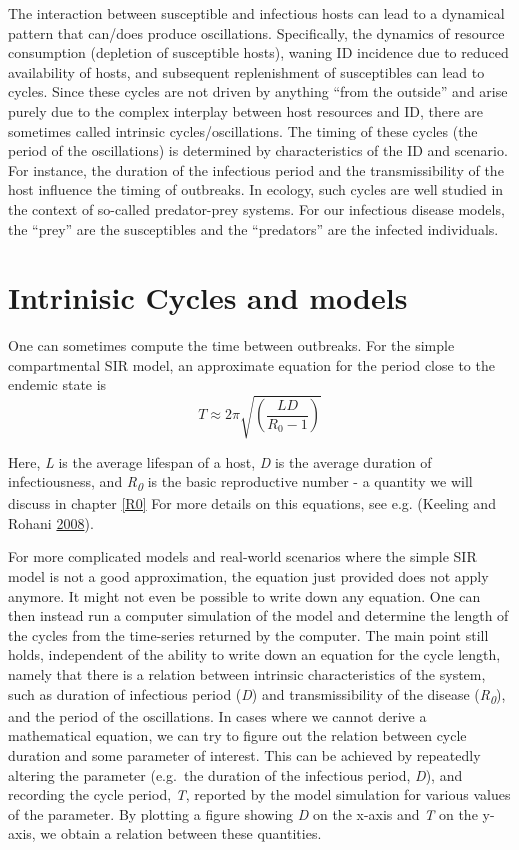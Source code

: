 \documentclass[]{book}
\theoremstyle{definition}
\theoremstyle{definition}
\theoremstyle{definition}
\theoremstyle{remark}
\begin{document}
The interaction between susceptible and infectious hosts can lead to a
dynamical pattern that can/does produce oscillations. Specifically, the
dynamics of resource consumption (depletion of susceptible hosts),
waning ID incidence due to reduced availability of hosts, and subsequent
replenishment of susceptibles can lead to cycles. Since these cycles are
not driven by anything ``from the outside'' and arise purely due to the
complex interplay between host resources and ID, there are sometimes
called intrinsic cycles/oscillations. The timing of these cycles (the
period of the oscillations) is determined by characteristics of the ID
and scenario. For instance, the duration of the infectious period and
the transmissibility of the host influence the timing of outbreaks. In
ecology, such cycles are well studied in the context of so-called
predator-prey systems. For our infectious disease models, the ``prey''
are the susceptibles and the ``predators'' are the infected individuals.

\section{Intrinisic Cycles and
models}\label{intrinisic-cycles-and-models}

One can sometimes compute the time between outbreaks. For the simple
compartmental SIR model, an approximate equation for the period close to
the endemic state is
\[T \approx 2 \pi \sqrt{\left( \frac{LD}{R_0 - 1} \right)}\]

Here, \emph{L} is the average lifespan of a host, \emph{D} is the
average duration of infectiousness, and \emph{R\textsubscript{0}} is the
basic reproductive number - a quantity we will discuss in chapter
\ref{R0} For more details on this equations, see e.g. (Keeling and
Rohani \protect\hyperlink{ref-keeling08}{2008}).

For more complicated models and real-world scenarios where the simple
SIR model is not a good approximation, the equation just provided does
not apply anymore. It might not even be possible to write down any
equation. One can then instead run a computer simulation of the model
and determine the length of the cycles from the time-series returned by
the computer. The main point still holds, independent of the ability to
write down an equation for the cycle length, namely that there is a
relation between intrinsic characteristics of the system, such as
duration of infectious period (\emph{D}) and transmissibility of the
disease (\emph{R\textsubscript{0}}), and the period of the oscillations.
In cases where we cannot derive a mathematical equation, we can try to
figure out the relation between cycle duration and some parameter of
interest. This can be achieved by repeatedly altering the parameter
(e.g.~the duration of the infectious period, \emph{D}), and recording
the cycle period, \emph{T}, reported by the model simulation for various
values of the parameter. By plotting a figure showing \emph{D} on the
x-axis and \emph{T} on the y-axis, we obtain a relation between these
quantities.
\end{document}
